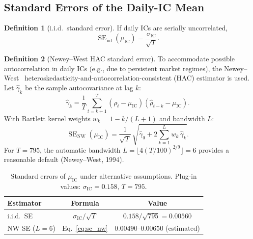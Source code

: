 \documentclass[11pt,a4paper]{article}
\theoremstyle{definition}
\newtheorem{definition}{Definition}[section]
\newcommand{\IC}{\operatorname{IC}}
\newcommand{\SE}{\operatorname{SE}}
\begin{document}
\subsection{Standard Errors of the Daily-IC Mean}

\begin{definition}[i.i.d.\ standard error]
If daily ICs are serially uncorrelated,
\begin{equation}
    \SE_{\text{iid}}(\mu_{\IC}) = \frac{\sigma_{\IC}}{\sqrt{T}}.
    \label{eq:se_iid}
\end{equation}
\end{definition}

\begin{definition}[Newey--West HAC standard error]
To accommodate possible autocorrelation in daily ICs (e.g., due to
persistent market regimes), the Newey--West~\cite{newey1987}
heteroskedasticity-and-autocorrelation-consistent (HAC) estimator is
used. Let $\hat{\gamma}_{k}$ be the sample autocovariance at lag $k$:
\begin{equation}
    \hat{\gamma}_{k} = \frac{1}{T}\sum_{t=k+1}^{T}
                       (\hat{\rho}_{t}-\mu_{\IC})
                       (\hat{\rho}_{t-k}-\mu_{\IC}).
    \label{eq:acf}
\end{equation}
With Bartlett kernel weights $w_{k}=1-k/(L+1)$ and bandwidth $L$:
\begin{equation}
    \SE_{\text{NW}}(\mu_{\IC}) =
    \frac{1}{\sqrt{T}}\,
    \sqrt{\hat{\gamma}_{0} + 2\sum_{k=1}^{L} w_{k}\,\hat{\gamma}_{k}}.
    \label{eq:se_nw}
\end{equation}
For $T=795$, the automatic bandwidth $L = \lfloor 4(T/100)^{2/9}\rfloor
= 6$ provides a reasonable default (Newey--West, 1994).
\end{definition}

\begin{table}[htbp]
\centering
\caption{Standard errors of $\mu_{\IC}$ under alternative assumptions.
         Plug-in values: $\sigma_{\IC}=0.158$, $T=795$.}
\label{tab:se_comparison}
\begin{tabular}{lcc}
\toprule
Estimator & Formula & Value \\
\midrule
i.i.d.\ SE         & $\sigma_{\IC}/\sqrt{T}$         & $0.158/\sqrt{795}=0.00560$ \\
NW SE ($L=6$)      & Eq.~\eqref{eq:se_nw}             & $0.00490$--$0.00650$ (estimated) \\
\bottomrule
\end{tabular}
\end{table}
\end{document}
